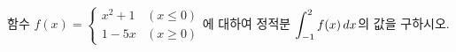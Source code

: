 함수 $f(x)=\begin{cases} x^2+1 & (x\le 0) \\ 1-5x & (x\ge 0) \end{cases}$에 대하여 정적분 $\displaystyle\int_{-1}^{2}f(x)\mkern3mu dx$의 값을 구하시오.
